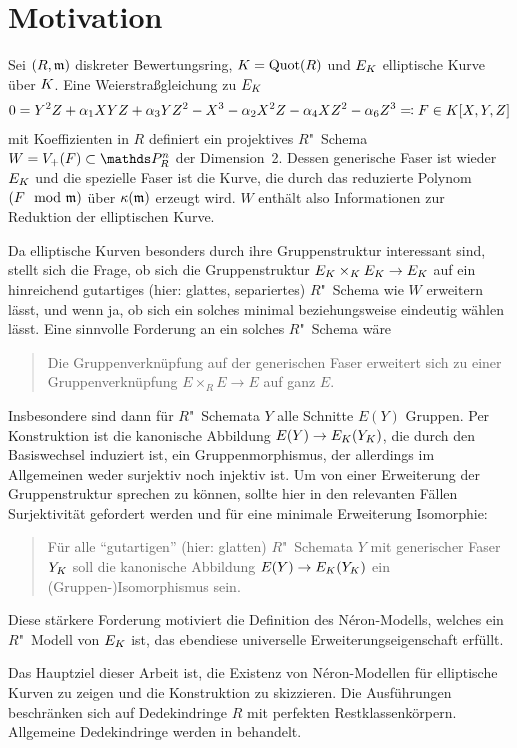 \chapter{Motivation}

Sei $(R,\mathfrak{m})$ diskreter Bewertungsring, $K=\operatorname{Quot}(R)$ und $E_{K}$
elliptische Kurve über $K$. Eine Weierstraßgleichung zu $E_{K}$
\begin{gather*}
  0 = Y^2 Z + \alpha_1 XYZ + \alpha_3 YZ^2 - X^3 - \alpha_2X^2 Z - \alpha_4 XZ^2 - \alpha_6 Z^3
  \eqqcolon F\in K[X,Y,Z]  
\end{gather*}
mit Koeffizienten in $R$ definiert ein projektives $R$"~Schema
$W=V_+(F)\subset\P_R^n$ der Dimension~2. Dessen generische Faser
ist wieder $E_{K}$ und die spezielle Faser ist die Kurve, die durch das
reduzierte Polynom $(F\mod{\mathfrak{m}})$ über $\kappa(\mathfrak{m})$ erzeugt wird.
$W$ enthält also Informationen zur Reduktion der elliptischen
Kurve.

Da elliptische Kurven besonders durch ihre Gruppenstruktur
interessant sind, stellt sich die Frage, ob sich die
Gruppenstruktur $E_{K}\times_{K} E_{K}\to E_{K}$ auf ein hinreichend
gutartiges (hier: glattes, separiertes) $R$"~Schema wie $W$ erweitern
lässt, und wenn ja, ob sich ein solches minimal beziehungsweise
eindeutig wählen lässt.
Eine sinnvolle Forderung an ein solches $R$"~Schema wäre
\begin{quote}
  Die Gruppenverknüpfung auf der generischen Faser erweitert sich zu
  einer Gruppenverknüpfung $E\times_R E\to E$ auf ganz $E$.
\end{quote}
Insbesondere sind dann für $R$"~Schemata $Y$ alle Schnitte $E(Y)$
Gruppen. Per Konstruktion ist die kanonische Abbildung
$E(Y)\to E_{K}(Y_{K})$, die durch den Basiswechsel induziert ist, ein
Gruppenmorphismus, der allerdings im Allgemeinen weder surjektiv noch
injektiv ist. Um von einer Erweiterung der Gruppenstruktur sprechen zu
können, sollte hier in den relevanten Fällen Surjektivität
gefordert werden und für eine minimale Erweiterung Isomorphie:
\begin{quote}
  Für alle \enquote{gutartigen} (hier: glatten) $R$"~Schemata $Y$ mit
  generischer Faser $Y_{K}$ soll die kanonische Abbildung
  $E(Y)\to E_{K}(Y_{K})$ ein (Gruppen-)Isomorphismus sein.
\end{quote}
Diese stärkere Forderung motiviert die Definition des
Néron-Modells, welches ein $R$"~Modell von $E_{K}$ ist, das ebendiese
universelle Erweiterungseigenschaft erfüllt.

Das Hauptziel dieser Arbeit ist, die Existenz von Néron-Modellen
für elliptische Kurven zu zeigen und die Konstruktion zu skizzieren.
Die Ausführungen beschränken sich auf Dedekindringe $R$ mit perfekten
Restklassenkörpern. Allgemeine Dedekindringe werden in
\cite{nonperfect} behandelt.

